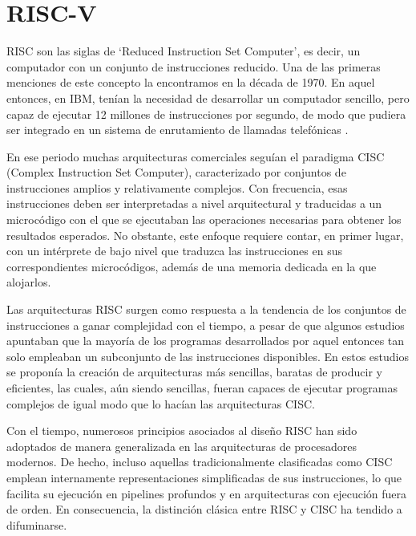 \chapter{RISC-V}

RISC son las siglas de `Reduced Instruction Set Computer', es decir, un computador con un conjunto de instrucciones reducido. Una de las primeras menciones de este concepto la encontramos en la década de 1970. En aquel entonces, en IBM, tenían la necesidad de desarrollar un computador sencillo, pero capaz de ejecutar 12 millones de instrucciones por segundo, de modo que pudiera ser integrado en un sistema de enrutamiento de llamadas telefónicas \cite{cocke1990evolution}.

En ese periodo muchas arquitecturas comerciales seguían el paradigma CISC (Complex Instruction Set Computer), caracterizado por conjuntos de instrucciones amplios y relativamente complejos. Con frecuencia, esas instrucciones deben ser interpretadas a nivel arquitectural y traducidas a un microcódigo con el que se ejecutaban las operaciones necesarias para obtener los resultados esperados. No obstante, este enfoque requiere contar, en primer lugar, con un intérprete de bajo nivel que traduzca las instrucciones en sus correspondientes microcódigos, además de una memoria dedicada en la que alojarlos.

Las arquitecturas RISC surgen como respuesta a la tendencia de los conjuntos de instrucciones a ganar complejidad con el tiempo, a pesar de que algunos estudios \cite{tanenbaum1978implications} apuntaban que la mayoría de los programas desarrollados por aquel entonces tan solo empleaban un subconjunto de las instrucciones disponibles. En estos estudios se proponía la creación de arquitecturas más sencillas, baratas de producir y eficientes, las cuales, aún siendo sencillas, fueran capaces de ejecutar programas complejos de igual modo que lo hacían las arquitecturas CISC.

Con el tiempo, numerosos principios asociados al diseño RISC han sido adoptados de manera generalizada en las arquitecturas de procesadores modernos. De hecho, incluso aquellas tradicionalmente clasificadas como CISC emplean internamente representaciones simplificadas de sus instrucciones, lo que facilita su ejecución en pipelines profundos y en arquitecturas con ejecución fuera de orden. En consecuencia, la distinción clásica entre RISC y CISC ha tendido a difuminarse.

